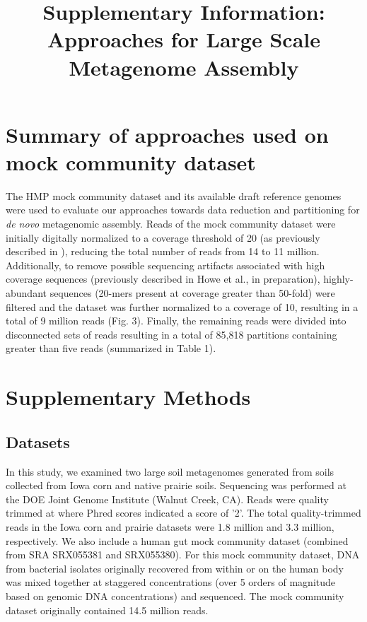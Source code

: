 \documentclass[11pt]{article} %
\title{Supplementary Information:  Approaches for Large Scale Metagenome Assembly}
\begin{document}
\maketitle
\section*{Summary of approaches used on mock community dataset}

The HMP mock community dataset and its available draft reference
genomes were used to evaluate our approaches towards data reduction
and partitioning for \emph{de novo} metagenomic assembly.  Reads of
the mock community dataset were initially digitally normalized to a
coverage threshold of 20 (as previously described in \cite{browndiginorm}),
reducing the total number of reads from 14 to 11 million.
Additionally, to remove possible sequencing artifacts associated with
high coverage sequences (previously described in Howe et al., in preparation),
highly-abundant sequences (20-mers present at coverage greater than
50-fold) were filtered and the dataset was further normalized to a
coverage of 10, resulting in a total of 9 million reads (Fig.
3).  Finally, the remaining reads were divided into
disconnected sets of reads resulting in a total of 85,818 partitions
containing greater than five reads (summarized in
Table 1).

\section*{Supplementary Methods}

\subsection*{Datasets}
In this study, we examined two large soil metagenomes generated from
soils collected from Iowa corn and native prairie soils.  Sequencing
was performed at the DOE Joint Genome Institute (Walnut Creek, CA).
Reads were quality trimmed at where Phred scores indicated a score of
'2'.  The total quality-trimmed reads in the Iowa corn and prairie
datasets were 1.8 million and 3.3 million, respectively.  We also
include a human gut mock community dataset (combined from SRA
SRX055381 and SRX055380).  For this mock community dataset, DNA from
bacterial isolates originally recovered from within or on the human
body was mixed together at staggered concentrations (over 5 orders of
magnitude based on genomic DNA concentrations) and sequenced.  The
mock community dataset originally contained 14.5 million reads.
\end{document}
